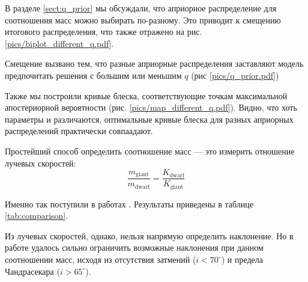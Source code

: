 В разделе \ref{sect:q_prior} мы обсуждали, что априорное распределение для соотношения масс можно выбирать по-разному. Это приводит к смещению итогового распределения, что также отражено на рис. \ref{pics/biplot_different_q.pdf}.


Смещение вызвано тем, что разные априорные распределения заставляют модель предпочитать решения с большим или меньшим $q$ (рис \ref{pics/q_prior.pdf})


Также мы построили кривые блеска, соответствующие точкам максимальной апостериорной вероятности (рис. \ref{pics/map_different_q.pdf}). Видно, что хоть параметры и различаются, оптимальные кривые блеска для разных априорных распределений практически совпаадают.




Простейший способ определить соотношение масс --- это измерить отношение лучевых скоростей:
\[
\frac{m_\text{giant}}{m_\text{dwarf}} = \frac{K_\text{dwarf}}{K_\text{giant}}
\]

Именно так поступили в работах \cite{Kraft, H_alpha}. Результаты приведены в таблице \ref{tab:comparison}.

Из лучевых скоростей, однако, нельзя напрямую определить наклонение. Но в работе \cite{H_alpha} удалось сильно ограничить возможные наклонения при данном соотношении масс, исходя из отсутствия затмений ($i < 70^\circ$) и предела Чандрасекара ($i > 65^\circ$).


